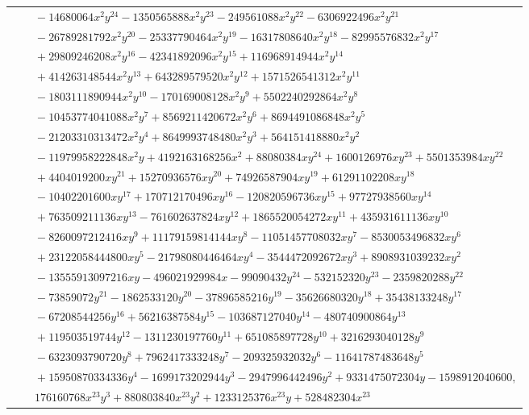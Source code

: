 \documentclass[11pt]{article}
\begin{document}
\begin{longtable}{@{}ll@{}}
 & $\quad -14680064x^{2}y^{24}-1350565888x^{2}y^{23}-249561088x^{2}y^{22}-6306922496x^{2}y^{21}$\\
 & $\quad -26789281792x^{2}y^{20}-25337790464x^{2}y^{19}-16317808640x^{2}y^{18}-82995576832x^{2}y^{17}$\\
 & $\quad +29809246208x^{2}y^{16}-42341892096x^{2}y^{15}+116968914944x^{2}y^{14}$\\
 & $\quad +414263148544x^{2}y^{13}+643289579520x^{2}y^{12}+1571526541312x^{2}y^{11}$\\
 & $\quad -1803111890944x^{2}y^{10}-170169008128x^{2}y^{9}+5502240292864x^{2}y^{8}$\\
 & $\quad -10453774041088x^{2}y^{7}+8569211420672x^{2}y^{6}+8694491086848x^{2}y^{5}$\\
 & $\quad -21203310313472x^{2}y^{4}+8649993748480x^{2}y^{3}+564151418880x^{2}y^{2}$\\
 & $\quad -11979958222848x^{2}y+4192163168256x^{2}+88080384xy^{24}+1600126976xy^{23}+5501353984xy^{22}$\\
 & $\quad +4404019200xy^{21}+15270936576xy^{20}+74926587904xy^{19}+61291102208xy^{18}$\\
 & $\quad -10402201600xy^{17}+170712170496xy^{16}-120820596736xy^{15}+97727938560xy^{14}$\\
 & $\quad +763509211136xy^{13}-761602637824xy^{12}+1865520054272xy^{11}+435931611136xy^{10}$\\
 & $\quad -8260097212416xy^{9}+11179159814144xy^{8}-11051457708032xy^{7}-8530053496832xy^{6}$\\
 & $\quad +23122058444800xy^{5}-21798080446464xy^{4}-3544472092672xy^{3}+8908931039232xy^{2}$\\
 & $\quad -13555913097216xy-496021929984x-99090432y^{24}-532152320y^{23}-2359820288y^{22}$\\
 & $\quad -73859072y^{21}-1862533120y^{20}-37896585216y^{19}-35626680320y^{18}+35438133248y^{17}$\\
 & $\quad -67208544256y^{16}+56216387584y^{15}-103687127040y^{14}-480740900864y^{13}$\\
 & $\quad +119503519744y^{12}-1311230197760y^{11}+651085897728y^{10}+3216293040128y^{9}$\\
 & $\quad -6323093790720y^{8}+7962417333248y^{7}-209325932032y^{6}-11641787483648y^{5}$\\
 & $\quad +15950870334336y^{4}-1699173202944y^{3}-2947996442496y^{2}+9331475072304y-1598912040600,$\\
 & $\quad 176160768x^{23}y^{3}+880803840x^{23}y^{2}+1233125376x^{23}y+528482304x^{23}$\\

\end{longtable}
\end{document}
